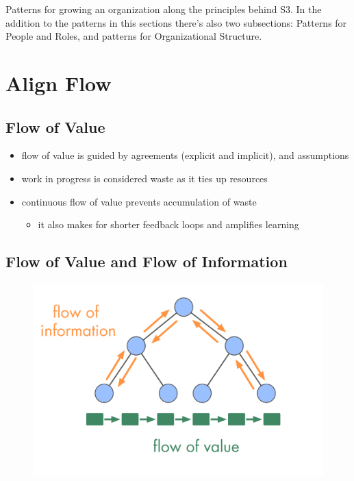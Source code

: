 Patterns for growing an organization along the principles behind S3. In the addition to the patterns in this sections there's also two subsections: Patterns for People and Roles, and patterns for Organizational Structure.

\section{Align Flow}
\label{alignflow}

\subsection{Flow of Value}
\label{flowofvalue}

\begin{itemize}
\item flow of value is guided by agreements (explicit and implicit), and assumptions

\item work in progress is considered waste as it ties up resources

\item continuous flow of value prevents accumulation of waste

\begin{itemize}
\item it also makes for shorter feedback loops and amplifies learning

\end{itemize}

\end{itemize}

\subsection{Flow of Value and Flow of Information}
\label{flowofvalueandflowofinformation}

\begin{figure}[htbp]
\centering
\includegraphics[keepaspectratio,width=\textwidth,height=0.75\textheight]{img/workflow-and-value/types-of-flow.png}
\end{figure}

